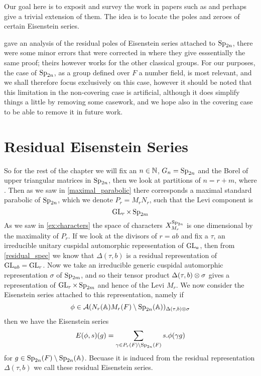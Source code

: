 Our goal here is to exposit and survey the work in papers such as \cite{brennerNotesAnalyticProperties2009}\cite{jiangPolesCertainResidual2013}\cite{ginzburgTopFourierCoefficients2021} and perhaps give a trivial extension of them. The idea is to locate the poles and zeroes of certain Eisenstein series. 

\cite{brennerNotesAnalyticProperties2009} gave an analysis of the residual poles of Eisenstein series attached to \(\operatorname{Sp}_{2n}\), there were some minor errors that were corrected in \cite{jiangPolesCertainResidual2013} where they give esssentially the same proof; theirs however works for the other classical groups. For our purposes, the case of \(\operatorname{Sp}_{2n}\), as a group defined over \(F\) a number field, is most relevant, and we shall therefore focus exclusively on this case, however it should be noted that this limitation in the non-covering case is artificial, although it does simplify things a little by removing some casework, and we hope also in the covering case to be able to remove it in future work. 

\section{Residual Eisenstein Series}
So for the rest of the chapter we will fix an \(n\in \N\), \(G_n = \operatorname{Sp}_{2n}\) and the Borel of upper triangular matrices in \(\operatorname{Sp}_{2n} \), then we look at partitions of \(n = r + m\), where . Then as we saw in \ref{maximal_parabolic} there corresponds a maximal standard parabolic of \(\operatorname{Sp}_{2n}\), which we denote \(P_r = M_rN_r\), such that the Levi component is 
\[\operatorname{GL}_r\times \operatorname{Sp}_{2m} \]
As we saw in \ref{ex:characters} the space of characters \(X^{\operatorname{Sp}_{2n}}_{M_r}\) is one dimensional by the maximality of \(P_r\). If we look at the divisors of \(r = ab\) 
 and fix a \(\tau\), an irreducible unitary cuspidal automorphic representation of \(\operatorname{GL}_a\), then from \ref{residual_spec} we know that \(\Delta(\tau, b)\) is a residual representation of \(\operatorname{GL}_{ab} = \operatorname{GL}_r\). Now we take an irreducible generic cuspidal automorphic representation \(\sigma\) of \(\operatorname{Sp}_{2m}\), and so their tensor product \(\Delta(\tau, b) \otimes \sigma\) gives a representation of \(\operatorname{GL}_{r}\times \operatorname{Sp}_{2m}\) and hence of the Levi \(M_r\). We now consider the Eisenstein series attached to this representation, namely if 
\[\phi\in \mathcal{A}(N_r(\A)M_r(F)\setminus \Sp_{2n}(\A) )_{\Delta(\tau, b)\tensor \sigma}\] 
then we have the Eisenstein series
\[E(\phi, s)(g) = \sum_{\gamma\in P_r(F) \setminus \Sp_{2n}(F)} s.\phi(\gamma g)\]
for \(g\in \Sp_{2n}(F) \setminus \Sp_{2n}(\A)\). Becuase it is induced from the residual representation \(\Delta(\tau, b)\) we call these residual Eisenstein series.

